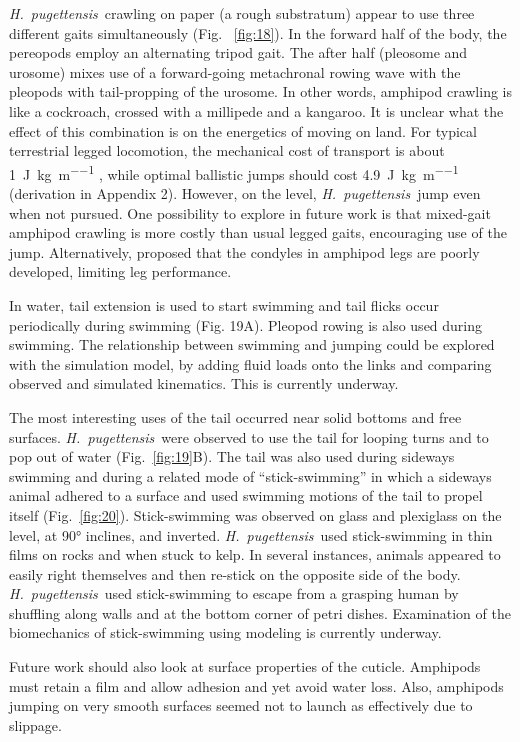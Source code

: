 \documentclass{article}
\newcommand{\Genus}[1]{\emph{#1}}
\newcommand{\Hyale}{\Genus{H.~pugettensis}}
\begin{document}
\Hyale\ crawling on paper (a rough substratum) appear to use three different gaits simultaneously (Fig. ~\ref{fig:18}).  In the forward half of the body, the pereopods employ an alternating tripod gait.  The after half (pleosome and urosome) mixes use of a forward-going metachronal rowing wave with the pleopods with tail-propping of the urosome.  In other words, amphipod crawling is like a cockroach, crossed with a millipede and a kangaroo.  It is unclear what the effect of this combination is on the energetics of moving on land.  For typical terrestrial legged locomotion, the mechanical cost of transport is about \SI{1}{\joule\per\kilo\gram\per\meter} \citep{Full:2001}, while optimal ballistic jumps should cost \SI{4.9}{\joule\per\kilo\gram\per\meter} (derivation in Appendix 2).  However, on the level, \Hyale\ jump even when not pursued.  One possibility to explore in future work is that mixed-gait amphipod crawling is more costly than usual legged gaits, encouraging use of the jump.  Alternatively, \citep{Schmitz:1991} proposed that the condyles in amphipod legs are poorly developed, limiting leg performance.
	
In water, tail extension is used to start swimming and tail flicks occur periodically during swimming (Fig. 19A).  Pleopod rowing is also used during swimming.  The relationship between swimming and jumping could be explored with the simulation model, by adding fluid loads onto the links and comparing observed and simulated kinematics.  This is currently underway. 
	
The most interesting uses of the tail occurred near solid bottoms and free surfaces.  \Hyale\ were observed to use the tail for looping turns and to pop out of water (Fig.~\ref{fig:19}B).  The tail was also used during sideways swimming and during a related mode of ``stick-swimming'' in which a sideways animal adhered to a surface and used swimming motions of the tail to propel itself (Fig.~\ref{fig:20}).  Stick-swimming was observed on glass and plexiglass on the level, at \ang{90} inclines, and inverted.   \Hyale\ used stick-swimming in thin films on rocks and when stuck to kelp.  In several instances, animals appeared to easily right themselves and then re-stick on the opposite side of the body.  \Hyale\ used stick-swimming to escape from a grasping human by shuffling along walls and at the bottom corner of petri dishes.  Examination of the biomechanics of stick-swimming using modeling is currently underway.  
	
Future work should also look at surface properties of the cuticle.  Amphipods must retain a film and allow adhesion and yet avoid water loss.  Also, amphipods jumping on very smooth surfaces seemed not to launch as effectively due to slippage.   
	
\end{document}
